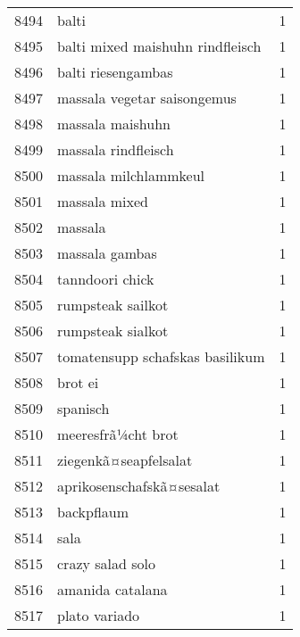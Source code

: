 \begin{tabular}{llr}
8494 &                                              balti &      1 \\
8495 &                   balti mixed maishuhn rindfleisch &      1 \\
8496 &                                 balti riesengambas &      1 \\
8497 &                        massala vegetar saisongemus &      1 \\
8498 &                                   massala maishuhn &      1 \\
8499 &                                massala rindfleisch &      1 \\
8500 &                              massala milchlammkeul &      1 \\
8501 &                                      massala mixed &      1 \\
8502 &                                            massala &      1 \\
8503 &                                     massala gambas &      1 \\
8504 &                                    tanndoori chick &      1 \\
8505 &                                  rumpsteak sailkot &      1 \\
8506 &                                  rumpsteak sialkot &      1 \\
8507 &                    tomatensupp schafskas basilikum &      1 \\
8508 &                                            brot ei &      1 \\
8509 &                                           spanisch &      1 \\
8510 &                                 meeresfrã¼cht brot &      1 \\
8511 &                              ziegenkã¤seapfelsalat &      1 \\
8512 &                          aprikosenschafskã¤sesalat &      1 \\
8513 &                                         backpflaum &      1 \\
8514 &                                               sala &      1 \\
8515 &                                   crazy salad solo &      1 \\
8516 &                                   amanida catalana &      1 \\
8517 &                                      plato variado &      1 \\

\end{tabular}
